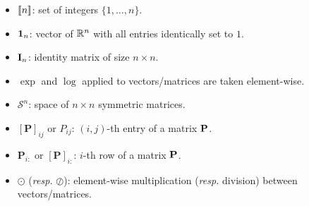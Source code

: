 \begin{itemize}
	\item ${[\![n]\!]}$: set of integers $\{1,\dots,n\}$.
	\item $\bm{1}_{n}$: vector of $\mathbb{R}^{n}$ with all entries identically set to $1$.
	\item ${\mathbf{I}}_n$: identity matrix of size $n \times n$.
    \item $\exp$ and $\log$ applied to vectors/matrices are taken element-wise.
    \item $\mathcal{S}^n$: space of $n \times n$ symmetric matrices.
    \item $[\mathbf{P}]_{ij}$ or $P_{ij}$: $(i,j)$-th entry of a matrix $\mathbf{P}$.
    \item $\mathbf{P}_{i:}$ or $[\mathbf{P}]_{i:}$: $i$-th row of a matrix $\mathbf{P}$.
    \item $\odot$ (\textit{resp.} $\oslash$): element-wise multiplication (\textit{resp.} division) between vectors/matrices.

\end{itemize}
